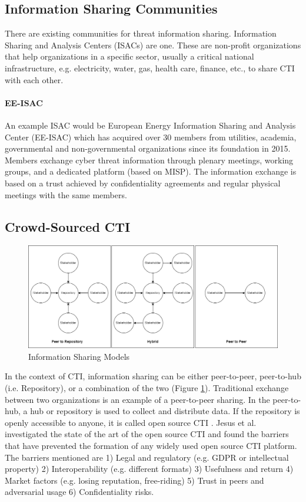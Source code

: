 \documentclass{article}
\begin{document}
\subsection{Information Sharing Communities}
There are existing communities for threat information sharing. Information Sharing and Analysis Centers (ISACs) are one. These are non-profit organizations that help organizations in a specific sector, usually a critical national infrastructure, e.g. electricity, water, gas, health care, finance, etc., to share CTI with each other. 
\paragraph{EE-ISAC}
An example ISAC would be
European Energy Information Sharing and Analysis Center (EE-ISAC)
which has acquired over 30 members from utilities, academia, governmental and non-governmental organizations since its foundation in 2015. Members exchange cyber threat information through plenary meetings, working groups, and a dedicated platform (based on MISP). The information exchange is based on a trust achieved by confidentiality agreements and regular physical meetings with the same members. 
\cite{wallis_ee-isacpractical_2022}

\subsection{Crowd-Sourced CTI}

\begin{figure}[ht]
    \centering
    \includegraphics[width=\textwidth]{sharing_models}
    \caption{Information Sharing Models}
    \label{fig:sharing-models}
\end{figure}

In the context of CTI, information sharing can be either peer-to-peer, peer-to-hub (i.e. Repository), or a combination of the two (Figure \ref{fig:sharing-models}). Traditional exchange between two organizations is an example of a peer-to-peer sharing. In the peer-to-hub, a hub or repository is used to collect and distribute data. If the repository is openly accessible to anyone, it is called open source CTI \cite{jesus_sharing_2023}. Jesus et al. \cite{jesus_sharing_2023} investigated the state of the art of the open source CTI and found the barriers that have prevented the formation of any widely used open source CTI platform. 
The barriers mentioned are 1) Legal and regulatory (e.g. GDPR or intellectual property) 2) Interoperability (e.g. different formats) 3) Usefulness and return 4) Market factors (e.g. losing reputation, free-riding) 5) Trust in peers and adversarial usage 6) Confidentiality risks.
\end{document}
